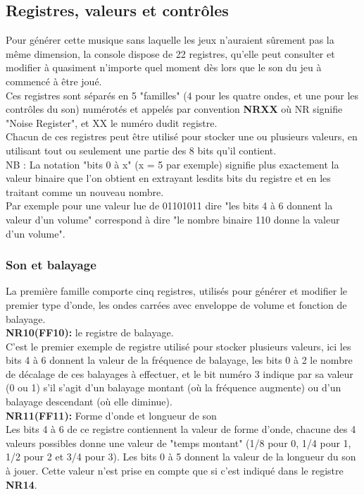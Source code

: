 \documentclass[french]{report}
\begin{document}
\subsection{Registres, valeurs et contrôles} 
	Pour générer cette musique sans laquelle les jeux n'auraient
	sûrement pas la même dimension, la console dispose de 22
	registres, qu'elle peut consulter et modifier à quasiment
	n'importe quel moment dès lors que le son du jeu à commencé à
	être joué.\\
	Ces registres sont séparés en 5 "familles" (4 pour les quatre
	ondes, et une pour les contrôles du son) numérotés et appelés
	par convention \textbf{NRXX} où NR signifie "Noise Register", et XX le
	numéro dudit registre. \\
	Chacun de ces registres peut être utilisé pour stocker une
	ou plusieurs valeurs, en utilisant tout ou seulement une
	partie des 8 bits qu'il contient.\\

	NB : La notation "bits 0 à x" (x = 5 par exemple) signifie
	plus exactement la valeur binaire que l'on obtient en
	extrayant lesdits bits du registre et en les traitant comme un
	nouveau nombre.\\
	Par exemple pour une valeur lue de 01101011 dire "les bits 4 à
	6 donnent la valeur d'un volume" correspond à dire "le nombre binaire
	110 donne la valeur d'un volume".

	\subsubsection{Son et balayage}
	La première famille comporte cinq registres, utilisés pour
	générer et modifier le premier type d'onde, les ondes carrées
	avec enveloppe de volume et fonction de balayage.\\

	\textbf{NR10(FF10):} le registre de balayage.\\
		C'est le premier exemple de registre utilisé pour
		stocker plusieurs valeurs, ici les bits 4 à 6 donnent
		la valeur de la fréquence de balayage, les bits 0 à 2
		le nombre de décalage de ces balayages à effectuer, et le bit
		numéro 3 indique par sa valeur (0 ou 1) s'il s'agit
		d'un balayage montant (où la fréquence augmente) ou
		d'un balayage descendant (où elle diminue).\\ 
	
	\textbf{NR11(FF11):} Forme d'onde et longueur de son\\
		Les bits 4 à 6 de ce registre contiennent la valeur de
		forme d'onde, chacune des 4 valeurs possibles donne
		une valeur de "temps montant" (1/8 pour 0, 1/4 pour
		1, 1/2 pour 2 et 3/4 pour 3).
		Les bits 0 à 5 donnent la valeur de la longueur
		du son à jouer. Cette valeur n'est prise en
		compte que si c'est indiqué dans le registre \textbf{NR14}.\\
	
\end{document}
